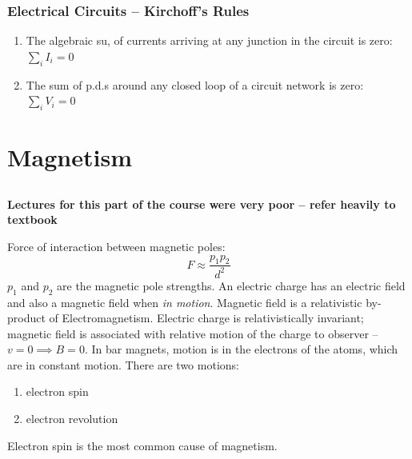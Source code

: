 \documentclass[a4paper, 11pt, normalem]{report}
\begin{document}
\section{Electrical Circuits -- Kirchoff's Rules}
\begin{enumerate}
    \item The algebraic su, of currents arriving at any junction in the circuit is zero: $\sum_{i} I_{i} = 0$
    \item The sum of p.d.s around any closed loop of a circuit network is zero: $\sum_{i} V_{i} = 0$
\end{enumerate}

\part{Magnetism}
\chapter{}
\textbf{Lectures for this part of the course were very poor -- refer heavily to textbook}

Force of interaction between magnetic poles:
\begin{equation}
    F \approx \frac{p_{1}p_{2}}{d^{2}}
\end{equation}
$p_{1}$ and $p_{2}$ are the magnetic pole strengths.
An electric charge has an electric field and also a magnetic field when \emph{in motion}.
Magnetic field is a relativistic by-product of Electromagnetism.
Electric charge is relativistically invariant; magnetic field is associated with relative motion of the charge to observer -- $v = 0 \implies B = 0$.
In bar magnets, motion is in the electrons of the atoms, which are in constant motion. 
There are two motions:
\begin{enumerate}
    \item electron spin
    \item electron revolution
\end{enumerate}
Electron spin is the most common cause of magnetism.
\end{document}
